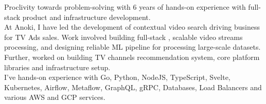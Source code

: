 
Proclivity towards problem-solving with 6 years of hands-on experience with full-stack product and infrastructure development. \\
At Anoki, I have led the development of contextual video search driving business for TV Ads sales.
Work involved building full-stack , scalable video streams processing, and designing reliable ML pipeline for processing large-scale datasets. 
Further, worked on building TV channels recommendation system, core platform libraries and infrastructure setup.\\

I've hands-on experience with Go, Python, NodeJS, TypeScript, Svelte, Kubernetes, Airflow, Metaflow, GraphQL, gRPC, Databases, Load Balancers 
and various AWS and GCP services.


